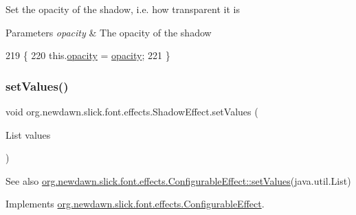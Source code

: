 Set the opacity of the shadow, i.\+e. how transparent it is


\begin{DoxyParams}{Parameters}
{\em opacity} & The opacity of the shadow \\
\hline
\end{DoxyParams}

\begin{DoxyCode}
219                                           \{
220         this.\mbox{\hyperlink{classorg_1_1newdawn_1_1slick_1_1font_1_1effects_1_1_shadow_effect_a6a03f4db2ffd55023ab5f9fde923dc0e}{opacity}} = \mbox{\hyperlink{classorg_1_1newdawn_1_1slick_1_1font_1_1effects_1_1_shadow_effect_a6a03f4db2ffd55023ab5f9fde923dc0e}{opacity}};
221     \}
\end{DoxyCode}
\mbox{\label{classorg_1_1newdawn_1_1slick_1_1font_1_1effects_1_1_shadow_effect_a448d46d24d5af92c2e7b902545cd2449}} 
\subsubsection{\texorpdfstring{set\+Values()}{setValues()}}
{\footnotesize\ttfamily void org.\+newdawn.\+slick.\+font.\+effects.\+Shadow\+Effect.\+set\+Values (\begin{DoxyParamCaption}\item[{List}]{values }\end{DoxyParamCaption})\hspace{0.3cm}{\ttfamily [inline]}}

\begin{DoxySeeAlso}{See also}
\mbox{\hyperlink{interfaceorg_1_1newdawn_1_1slick_1_1font_1_1effects_1_1_configurable_effect_ac5e1cb43cb0c6b61753616dc746903a2}{org.\+newdawn.\+slick.\+font.\+effects.\+Configurable\+Effect\+::set\+Values}}(java.\+util.\+List) 
\end{DoxySeeAlso}


Implements \mbox{\hyperlink{interfaceorg_1_1newdawn_1_1slick_1_1font_1_1effects_1_1_configurable_effect_ac5e1cb43cb0c6b61753616dc746903a2}{org.\+newdawn.\+slick.\+font.\+effects.\+Configurable\+Effect}}.


